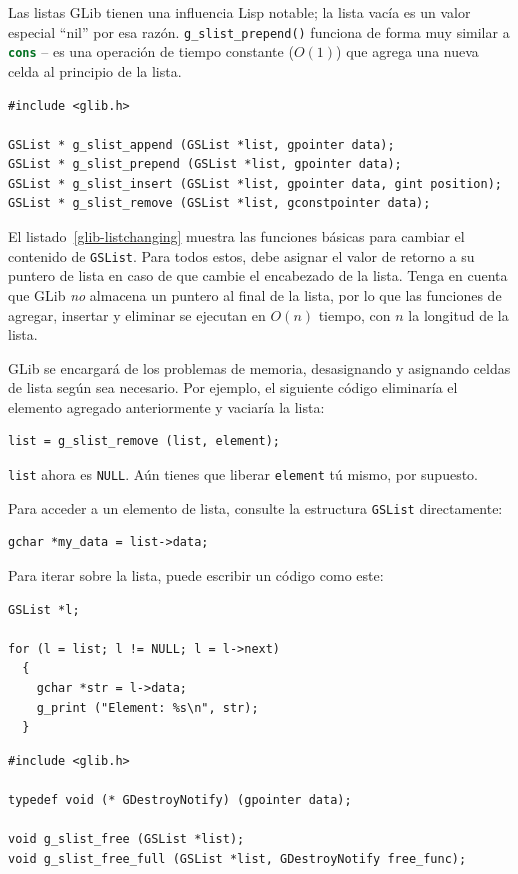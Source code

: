 Las listas GLib tienen una influencia Lisp notable; la lista vacía es un valor especial ``nil'' por esa razón. \lstinline{g_slist_prepend()} funciona de forma muy similar a \lstinline[language=Lisp]{cons} -- es una operación de tiempo constante ($O(1)$) que agrega una nueva celda al principio de la lista.

\begin{lstlisting}[float, caption={Changing linked list contents}, label=glib-listchanging]
#include <glib.h>

GSList * g_slist_append (GSList *list, gpointer data);
GSList * g_slist_prepend (GSList *list, gpointer data);
GSList * g_slist_insert (GSList *list, gpointer data, gint position);
GSList * g_slist_remove (GSList *list, gconstpointer data);
\end{lstlisting}

El listado~\ref{glib-listchanging} muestra las funciones básicas para cambiar el contenido de \lstinline{GSList}. Para todos estos, debe asignar el valor de retorno a su puntero de lista en caso de que cambie el encabezado de la lista. Tenga en cuenta que GLib \emph{no} almacena un puntero al final de la lista, por lo que las funciones de agregar, insertar y eliminar se ejecutan en $O(n)$ tiempo, con $n$ la longitud de la lista.

GLib se encargará de los problemas de memoria, desasignando y asignando celdas de lista según sea necesario. Por ejemplo, el siguiente código eliminaría el elemento agregado anteriormente y vaciaría la lista:
\begin{lstlisting}
list = g_slist_remove (list, element);
\end{lstlisting}

\lstinline{list} ahora es \lstinline{NULL}. Aún tienes que liberar \lstinline{element} tú mismo, por supuesto.

Para acceder a un elemento de lista, consulte la estructura \lstinline{GSList} directamente:
\begin{lstlisting}
gchar *my_data = list->data;
\end{lstlisting}

Para iterar sobre la lista, puede escribir un código como este:
\begin{lstlisting}
GSList *l;

for (l = list; l != NULL; l = l->next)
  {
    gchar *str = l->data;
    g_print ("Element: %s\n", str);
  }
\end{lstlisting}

\begin{lstlisting}[float, caption={Freeing entire linked lists}, label=glib-listfree]
#include <glib.h>

typedef void (* GDestroyNotify) (gpointer data);

void g_slist_free (GSList *list);
void g_slist_free_full (GSList *list, GDestroyNotify free_func);
\end{lstlisting}

